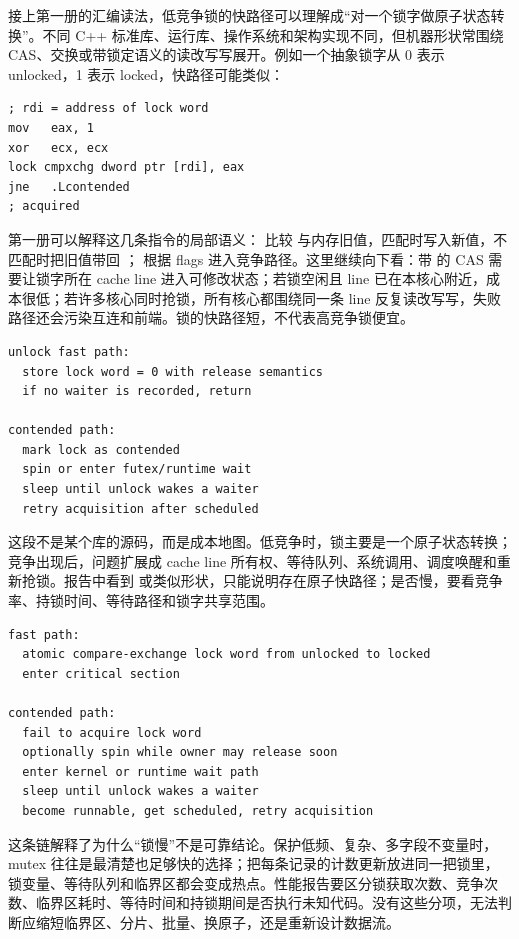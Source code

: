 接上第一册的汇编读法，低竞争锁的快路径可以理解成“对一个锁字做原子状态转换”。不同 C++ 标准库、运行库、操作系统和架构实现不同，但机器形状常围绕 CAS、交换或带锁定语义的读改写写展开。例如一个抽象锁字从 0 表示 unlocked，1 表示 locked，快路径可能类似：

\begin{lstlisting}[numbers=none,caption={mutex fast path 的典型汇编形状}]
; rdi = address of lock word
mov   eax, 1
xor   ecx, ecx
lock cmpxchg dword ptr [rdi], eax
jne   .Lcontended
; acquired
\end{lstlisting}

第一册可以解释这几条指令的局部语义： 比较  与内存旧值，匹配时写入新值，不匹配时把旧值带回 ； 根据 flags 进入竞争路径。这里继续向下看：带  的 CAS 需要让锁字所在 cache line 进入可修改状态；若锁空闲且 line 已在本核心附近，成本很低；若许多核心同时抢锁，所有核心都围绕同一条 line 反复读改写写，失败路径还会污染互连和前端。锁的快路径短，不代表高竞争锁便宜。

\begin{lstlisting}[numbers=none,caption={unlock 和等待路径的粗略机器形状}]
unlock fast path:
  store lock word = 0 with release semantics
  if no waiter is recorded, return

contended path:
  mark lock as contended
  spin or enter futex/runtime wait
  sleep until unlock wakes a waiter
  retry acquisition after scheduled
\end{lstlisting}

这段不是某个库的源码，而是成本地图。低竞争时，锁主要是一个原子状态转换；竞争出现后，问题扩展成 cache line 所有权、等待队列、系统调用、调度唤醒和重新抢锁。报告中看到  或类似形状，只能说明存在原子快路径；是否慢，要看竞争率、持锁时间、等待路径和锁字共享范围。

\begin{lstlisting}[numbers=none,caption={mutex 获取的粗粒度事件链}]
fast path:
  atomic compare-exchange lock word from unlocked to locked
  enter critical section

contended path:
  fail to acquire lock word
  optionally spin while owner may release soon
  enter kernel or runtime wait path
  sleep until unlock wakes a waiter
  become runnable, get scheduled, retry acquisition
\end{lstlisting}

这条链解释了为什么“锁慢”不是可靠结论。保护低频、复杂、多字段不变量时，mutex 往往是最清楚也足够快的选择；把每条记录的计数更新放进同一把锁里，锁变量、等待队列和临界区都会变成热点。性能报告要区分锁获取次数、竞争次数、临界区耗时、等待时间和持锁期间是否执行未知代码。没有这些分项，无法判断应缩短临界区、分片、批量、换原子，还是重新设计数据流。

